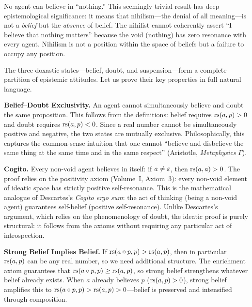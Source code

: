 \begin{interpretation}
No agent can believe in ``nothing.'' This seemingly trivial result has deep
epistemological significance: it means that nihilism---the denial of all
meaning---is not a \emph{belief} but the \emph{absence} of belief. The
nihilist cannot coherently assert ``I believe that nothing matters'' because
the void (nothing) has zero resonance with every agent. Nihilism is not a
position within the space of beliefs but a failure to occupy any position.
\end{interpretation}

\begin{remark}
The three doxastic states---belief, doubt, and suspension---form a complete
partition of epistemic attitudes. Let us prove their key properties in full
natural language.

\textbf{Belief--Doubt Exclusivity.} An agent cannot simultaneously believe and
doubt the same proposition. This follows from the definitions: belief requires
$\mathrm{rs}(a, p) > 0$ and doubt requires $\mathrm{rs}(a, p) < 0$. Since a real number
cannot be simultaneously positive and negative, the two states are mutually
exclusive. Philosophically, this captures the common-sense intuition that one
cannot ``believe and disbelieve the same thing at the same time and in the
same respect'' (Aristotle, \emph{Metaphysics} $\Gamma$).

\textbf{Cogito.} Every non-void agent believes in itself: if $a \neq \varepsilon$,
then $\mathrm{rs}(a, a) > 0$. The proof relies on the positivity axiom (Volume~I,
Axiom~3): every non-void element of ideatic space has strictly positive
self-resonance. This is the mathematical analogue of Descartes's
\emph{Cogito ergo sum}: the act of thinking (being a non-void agent) guarantees
self-belief (positive self-resonance). Unlike Descartes's argument, which
relies on the phenomenology of doubt, the ideatic proof is purely structural:
it follows from the axioms without requiring any particular act of introspection.

\textbf{Strong Belief Implies Belief.} If $\mathrm{rs}(a \circ p, p) > \mathrm{rs}(a, p)$,
then in particular $\mathrm{rs}(a, p)$ can be any real number, so we need additional
structure. The enrichment axiom guarantees that $\mathrm{rs}(a \circ p, p) \geq
\mathrm{rs}(a, p)$, so strong belief strengthens whatever belief already exists.
When $a$ already believes $p$ ($\mathrm{rs}(a, p) > 0$), strong belief amplifies
this to $\mathrm{rs}(a \circ p, p) > \mathrm{rs}(a, p) > 0$---belief is preserved and
intensified through composition.
\end{remark}

